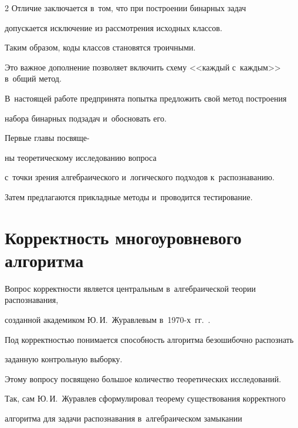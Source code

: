 \begin{multicols}{2}
Отличие заключается в~том, что при построении бинарных задач 


допускается исключение из рассмотрения исходных классов.


Таким образом, коды классов становятся троичными.


Это важное дополнение позволяет включить схему <<каждый с~каж\-дым>> в~общий метод.





В~настоящей работе предпринята попытка предложить свой метод построения 


набора бинарных подзадач и~обосновать его.


Первые главы посвяще-\linebreak\vspace*{-12pt}





\pagebreak





\noindent


ны теоретическому исследованию вопроса 


с~точки зрения алгебраического и~логического подходов к~распознаванию.


Затем предлагаются прикладные методы и~проводится тестирование.





\section{Корректность многоуровневого алгоритма} %





Вопрос корректности является центральным в~алгебраической теории распознавания, 


созданной академиком Ю.\,И.~Журавлевым в~1970-х~гг.~\cite{zhur1, zhur2}.


Под корректностью понимается способность алгоритма безошибочно распознать 


заданную контрольную выборку.


Этому вопросу посвящено большое количество теоретических исследований.


Так, сам Ю.\,И.~Журавлев сформулировал теорему существования корректного 


алгоритма для задачи распознавания в~алгебраическом замыкании 



\end{multicols}

